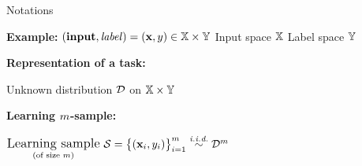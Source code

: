\documentclass{slides}
\begin{document}

\begin{xframe}{Notations}

    \vfill

    {\bf Example:}    \hspace{1cm}$(\text{\bf input}, {\it label}) = (\mathbf{x}, y) \in \mathbb{X}\times\mathbb{Y}$ \quad Input space $\mathbb{X}$ \quad Label space $\mathbb{Y}$
    
    \begin{figure}
    
    \end{figure}
    
    \vspace{0.3cm}
    
    {\bf Representation of a task:}
        
    \begin{minipage}{0.54\linewidth}
        \begin{center}
        Unknown distribution $\mathcal{D}$ on $\mathbb{X}\times\mathbb{Y}$
        \end{center}
    \end{minipage}
    \hfill
    \begin{minipage}{0.45\linewidth}
    
    \end{minipage}
    
    \vspace{0.3cm}
    
    {\bf Learning $m$-sample:}
    
    \begin{minipage}{0.64\linewidth}
        \begin{center}
        $\underset{\text{\scriptsize (of size $m$)}}{\text{\large Learning sample}}\ \mathcal{S} = \big\{(\mathbf{x}_i, y_i)\big\}_{i=1}^{m} \overset{\text{{\it i.i.d.}}}{\sim} \mathcal{D}^{m}$ 
        \end{center}
    \end{minipage}
    \hfill
    \begin{minipage}{0.35\linewidth}
        
    \end{minipage}
    
    \vfill
    
\end{xframe}
\end{document}
